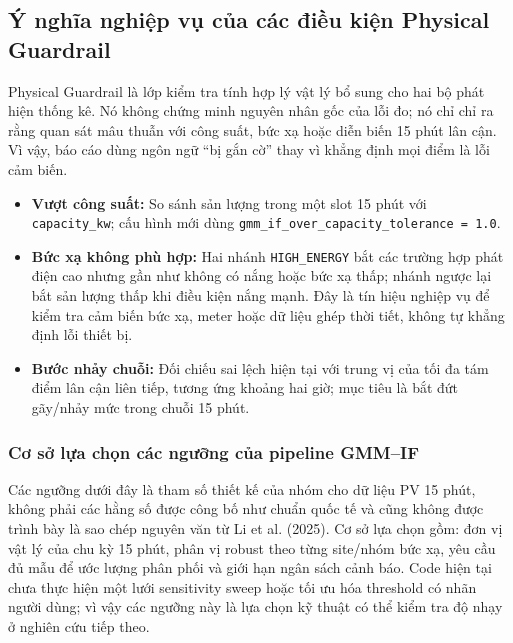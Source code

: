 \documentclass[12pt,a4paper]{article}
\begin{document}
\subsection[Ý nghĩa nghiệp vụ của Physical Guardrail]{Ý nghĩa nghiệp vụ của các điều kiện Physical Guardrail}
Physical Guardrail là lớp kiểm tra tính hợp lý vật lý bổ sung cho hai bộ phát hiện thống kê. Nó không chứng minh nguyên nhân gốc của lỗi đo; nó chỉ chỉ ra rằng quan sát mâu thuẫn với công suất, bức xạ hoặc diễn biến 15 phút lân cận. Vì vậy, báo cáo dùng ngôn ngữ ``bị gắn cờ'' thay vì khẳng định mọi điểm là lỗi cảm biến.

\begin{itemize}
    \item \textbf{Vượt công suất:} So sánh sản lượng trong một slot 15 phút với \texttt{capacity\_kw}; cấu hình mới dùng \texttt{gmm\_if\_over\_capacity\_tolerance = 1.0}.
    \item \textbf{Bức xạ không phù hợp:} Hai nhánh \texttt{HIGH\_ENERGY} bắt các trường hợp phát điện cao nhưng gần như không có nắng hoặc bức xạ thấp; nhánh ngược lại bắt sản lượng thấp khi điều kiện nắng mạnh. Đây là tín hiệu nghiệp vụ để kiểm tra cảm biến bức xạ, meter hoặc dữ liệu ghép thời tiết, không tự khẳng định lỗi thiết bị.
    \item \textbf{Bước nhảy chuỗi:} Đối chiếu sai lệch hiện tại với trung vị của tối đa tám điểm lân cận liên tiếp, tương ứng khoảng hai giờ; mục tiêu là bắt đứt gãy/nhảy mức trong chuỗi 15 phút.
\end{itemize}

\subsubsection{Cơ sở lựa chọn các ngưỡng của pipeline GMM--IF}
Các ngưỡng dưới đây là tham số thiết kế của nhóm cho dữ liệu PV 15 phút, không phải các hằng số được công bố như chuẩn quốc tế và cũng không được trình bày là sao chép nguyên văn từ Li et al. (2025). Cơ sở lựa chọn gồm: đơn vị vật lý của chu kỳ 15 phút, phân vị robust theo từng site/nhóm bức xạ, yêu cầu đủ mẫu để ước lượng phân phối và giới hạn ngân sách cảnh báo. Code hiện tại chưa thực hiện một lưới sensitivity sweep hoặc tối ưu hóa threshold có nhãn người dùng; vì vậy các ngưỡng này là lựa chọn kỹ thuật có thể kiểm tra độ nhạy ở nghiên cứu tiếp theo.
\end{document}
